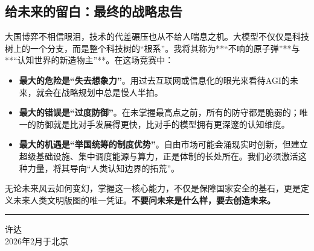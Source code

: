 \subsection*{给未来的留白：最终的战略忠告}

大国博弈不相信眼泪，技术的代差碾压也从不给人喘息之机。大模型不仅仅是科技树上的一个分支，而是整个科技树的“根系”。我将其称为**“不响的原子弹”**与**“认知世界的新造物主”**。在这场竞赛中：
\begin{itemize}
    \item \textbf{最大的危险是“失去想象力”}。用过去互联网或信息化的眼光来看待AGI的未来，就会在战略规划中总是慢人半拍。
    \item \textbf{最大的错误是“过度防御”}。在未掌握最高点之前，所有的防守都是脆弱的；唯一的防御就是比对手发展得更快，比对手的模型拥有更深邃的认知维度。
    \item \textbf{最大的机遇是“举国统筹的制度优势”}。自由市场可能会涌现实时创新，但建立超级基础设施、集中调度能源与算力，正是体制的长处所在。我们必须激活这种力量，将其导向“人类认知边界的拓荒”。
\end{itemize}

无论未来风云如何变幻，掌握这一核心能力，不仅是保障国家安全的基石，更是定义未来人类文明版图的唯一凭证。\textbf{不要问未来是什么样，要去创造未来。}

\noindent\rule{\textwidth}{0.4pt}
\bigskip

\begin{flushright}
许\quad 达\\
2026年2月于北京
\end{flushright}
